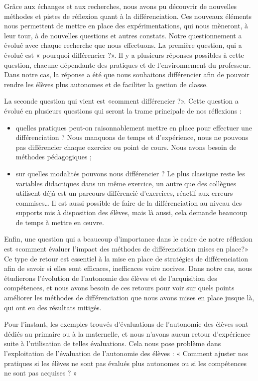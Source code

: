 Grâce aux échanges et aux recherches, nous avons pu découvrir de nouvelles méthodes et pistes de réflexion quant à la différenciation. Ces nouveaux éléments nous permettent de mettre en place des expérimentations, qui nous mèneront, à leur tour, à de nouvelles questions et autres constats.
Notre questionnement a évolué avec chaque recherche que nous effectuons. La première question, qui a évolué est « pourquoi différencier ?». Il y a plusieurs réponses possibles à cette question, chacune dépendante des pratiques et de l’environnement du professeur. Dans notre cas, la réponse a été que nous souhaitons différencier afin de pouvoir rendre les élèves plus autonomes et de faciliter la gestion de classe.

La seconde question qui vient est «comment différencier ?». Cette question a évolué en plusieurs questions qui seront la trame principale de nos réflexions :
\begin{itemize}
    \item quelles pratiques peut-on raisonnablement mettre en place pour effectuer une différenciation ? Nous manquons de temps et d’expérience, nous ne pouvons pas différencier chaque exercice ou point de cours. Nous avons besoin de méthodes pédagogiques ;
    \item sur quelles modalités pouvons nous différencier ? Le plus classique reste les variables didactiques dans un même exercice, un autre que des collègues utilisent déjà est un parcours différencié d’exercices, réactif aux erreurs commises… Il est aussi possible de faire de la différenciation au niveau des supports mis à disposition des élèves, mais là aussi, cela demande beaucoup de temps à mettre en œuvre.
\end{itemize}

Enfin, une question qui a beaucoup d’importance dans le cadre de notre réflexion est «comment évaluer l’impact des méthodes de différenciation mises en place?» Ce type de retour est essentiel à la mise en place de stratégies de différenciation afin de savoir si elles sont efficaces, inefficaces voire nocives. Dans notre cas, nous étudierons l’évolution de l’autonomie des élèves et de l’acquisition des compétences, et nous avons besoin de ces retours pour voir sur quels points améliorer les méthodes de différenciation que nous avons mises en place jusque là, qui ont eu des résultats mitigés. 

Pour l’instant, les exemples trouvés d’évaluations de l’autonomie des élèves sont dédiés au primaire ou à la maternelle, et nous n’avons aucun retour d’expérience suite à l’utilisation de telles évaluations. Cela nous pose problème dans l’exploitation de l’évaluation de l’autonomie des élèves : « Comment ajuster nos pratiques si les élèves ne sont pas évalués plus autonomes ou si les compétences ne sont pas acquises ? »

